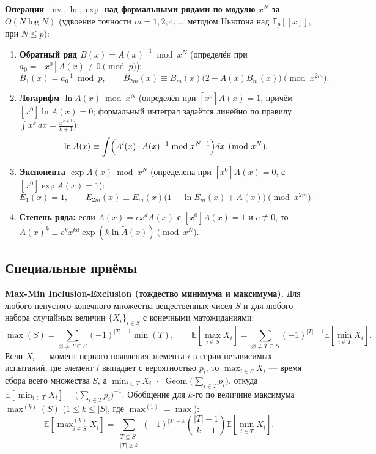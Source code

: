 \documentclass[10pt,a4paper]{article}
\renewcommand{\le}{\leqslant}
\renewcommand{\ge}{\geqslant}
\renewcommand{\emptyset}{\varnothing}
\newcommand{\F}{\mathbb{F}}
\newcommand{\E}{\mathbb{E}}
\DeclareMathOperator{\inv}{inv}
\DeclareMathOperator{\Geom}{Geom}
\begin{document}
\textbf{Операции $\inv, \ln, \exp$ над формальными рядами по модулю $x^N$ за $O(N \log N)$} (удвоение точности $m = 1, 2, 4, \dots$ методом Ньютона над $\F_p[[x]]$, при $N \le p$):
\begin{enumerate}
  \item \textbf{Обратный ряд $B(x) = A(x)^{-1} \bmod x^N$} (определён при $a_0 = [x^0]A(x) \not\equiv 0 \pmod p$):
  \[
    B_1(x) = a_0^{-1} \bmod p, \qquad
    B_{2m}(x) \equiv B_m(x)\bigl(2 - A(x)B_m(x)\bigr) \pmod{x^{2m}}.
  \]
  \item \textbf{Логарифм $\ln A(x) \bmod x^N$} (определён при $[x^0]A(x) = 1$, причём $[x^0]\ln A(x) = 0$; формальный интеграл задаётся линейно по правилу $\int x^k\,dx = \frac{x^{k + 1}}{k + 1}$):
  \[
    \ln A(x) \equiv \int \Bigl(A'(x) \cdot A(x)^{-1} \bmod x^{N - 1}\Bigr) dx \pmod{x^N}.
  \]
  \item \textbf{Экспонента $\exp A(x) \bmod x^N$} (определена при $[x^0]A(x) = 0$, с $[x^0]\exp A(x) = 1$):
  \[
    E_1(x) = 1, \qquad
    E_{2m}(x) \equiv E_m(x)\bigl(1 - \ln E_m(x) + A(x)\bigr) \pmod{x^{2m}}.
  \]
  \item \textbf{Степень ряда:} если $A(x) = c x^d \tilde{A}(x)$ с $[x^0]\tilde{A}(x) = 1$ и $c \not\equiv 0$, то $A(x)^k \equiv c^k x^{kd} \exp(k \ln \tilde{A}(x)) \pmod{x^N}$.
\end{enumerate}

\subsection{Специальные приёмы}

\textbf{Max-Min Inclusion-Exclusion (тождество минимума и максимума).} Для любого непустого конечного множества вещественных чисел $S$ и для любого набора случайных величин $\{X_i\}_{i \in S}$ с конечными матожиданиями:
\[
  \max(S) = \sum_{\emptyset \ne T \subseteq S} (-1)^{|T| - 1} \min(T), \qquad
  \E\!\left[\max_{i \in S} X_i\right] = \sum_{\emptyset \ne T \subseteq S} (-1)^{|T| - 1} \E\!\left[\min_{i \in T} X_i\right].
\]
Если $X_i$ — момент первого появления элемента $i$ в серии независимых испытаний, где элемент $i$ выпадает с вероятностью $p_i$, то $\max_{i \in S} X_i$ — время сбора всего множества $S$, а $\min_{i \in T} X_i \sim \Geom\bigl(\sum_{i \in T} p_i\bigr)$, откуда $\E[\min_{i \in T} X_i] = \bigl(\sum_{i \in T} p_i\bigr)^{-1}$.
Обобщение для $k$-го по величине максимума $\max^{(k)}(S)$ ($1 \le k \le |S|$, где $\max^{(1)} = \max$):
\[
  \E\!\left[\max\nolimits^{(k)}_{i \in S} X_i\right] = \sum_{\substack{T \subseteq S \\ |T| \ge k}} (-1)^{|T| - k} \binom{|T| - 1}{k - 1} \E\!\left[\min_{i \in T} X_i\right].
\]
\end{document}
